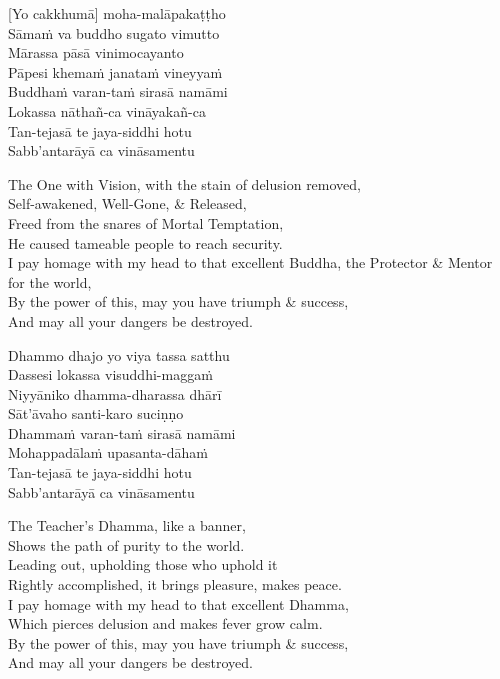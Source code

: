 [Yo cakkhumā] moha-malāpakaṭṭho\\
Sāmaṁ va buddho sugato vimutto\\
Mārassa pāsā vinimocayanto\\
Pāpesi khemaṁ janataṁ vineyyaṁ\\
Buddhaṁ varan-taṁ sirasā namāmi\\
Lokassa nāthañ-ca vināyakañ-ca\\
Tan-tejasā te jaya-siddhi hotu\\
Sabb’antarāyā ca vināsamentu

\begin{english}
  The One with Vision, with the stain of delusion removed,\\
  Self-awakened, Well-Gone, \& Released,\\
  Freed from the snares of Mortal Temptation,\\
  He caused tameable people to reach security.\\
  I pay homage with my head to that excellent Buddha, the Protector \& Mentor for the world,\\
  By the power of this, may you have triumph \& success,\\
  And may all your dangers be destroyed.
\end{english}

Dhammo dhajo yo viya tassa satthu\\
Dassesi lokassa visuddhi-maggaṁ\\
Niyyāniko dhamma-dharassa dhārī\\
Sāt’āvaho santi-karo suciṇṇo\\
Dhammaṁ varan-taṁ sirasā namāmi\\
Mohappadālaṁ upasanta-dāhaṁ\\
Tan-tejasā te jaya-siddhi hotu\\
Sabb’antarāyā ca vināsamentu

\begin{english}
  The Teacher's Dhamma, like a banner,\\
  Shows the path of purity to the world.\\
  Leading out, upholding those who uphold it\\
  Rightly accomplished, it brings pleasure, makes peace.\\
  I pay homage with my head to that excellent Dhamma,\\
  Which pierces delusion and makes fever grow calm.\\
  By the power of this, may you have triumph \& success,\\
  And may all your dangers be destroyed.
\end{english}

